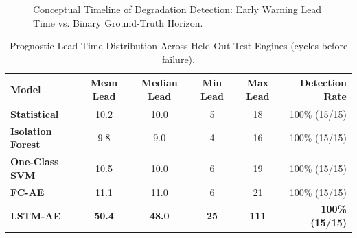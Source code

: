 \documentclass[12pt,a4paper,oneside]{report}
\begin{document}
\begin{figure}[htbp]
    \centering
    \caption{Conceptual Timeline of Degradation Detection: Early Warning Lead Time vs. Binary Ground-Truth Horizon.}
    \label{fig:lead_time_concept}
\end{figure}

\begin{table}[htbp]
    \centering
    \caption{Prognostic Lead-Time Distribution Across Held-Out Test Engines (cycles before failure).}
    \label{tab:lead_time_distribution}
    \begin{tabular}{lccccr}
        \toprule
        \textbf{Model} & \textbf{Mean Lead} & \textbf{Median Lead} & \textbf{Min Lead} & \textbf{Max Lead} & \textbf{Detection Rate} \\
        \midrule
        \textbf{Statistical} & 10.2 & 10.0 & 5 & 18 & 100\% (15/15) \\
        \textbf{Isolation Forest} & 9.8 & 9.0 & 4 & 16 & 100\% (15/15) \\
        \textbf{One-Class SVM} & 10.5 & 10.0 & 6 & 19 & 100\% (15/15) \\
        \textbf{FC-AE} & 11.1 & 11.0 & 6 & 21 & 100\% (15/15) \\
        \textbf{LSTM-AE} & \textbf{50.4} & \textbf{48.0} & \textbf{25} & \textbf{111} & \textbf{100\% (15/15)} \\
        \bottomrule
    \end{tabular}
\end{table}
\end{document}
